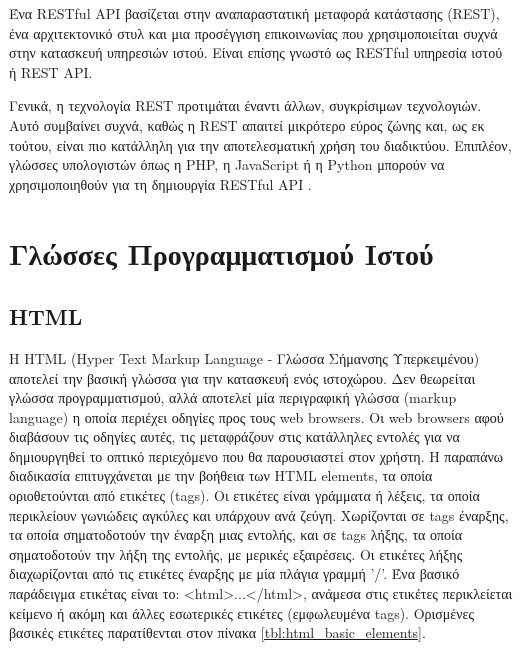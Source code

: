 Ένα RESTful API βασίζεται στην αναπαραστατική μεταφορά κατάστασης (REST), ένα αρχιτεκτονικό στυλ και μια προσέγγιση επικοινωνίας που χρησιμοποιείται συχνά στην κατασκευή υπηρεσιών ιστού. Είναι επίσης γνωστό ως RESTful υπηρεσία ιστού ή REST API.

Γενικά, η τεχνολογία REST προτιμάται έναντι άλλων, συγκρίσιμων τεχνολογιών. Αυτό συμβαίνει συχνά, καθώς η REST απαιτεί μικρότερο εύρος ζώνης και, ως εκ τούτου, είναι πιο κατάλληλη για την αποτελεσματική χρήση του διαδικτύου. Επιπλέον, γλώσσες υπολογιστών όπως η PHP, η JavaScript ή η Python μπορούν να χρησιμοποιηθούν για τη δημιουργία RESTful API \cite{Gillis_2020}.

\section{Γλώσσες Προγραμματισμού Ιστού}

\subsection{HTML}
Η HTML (Hyper Text Markup Language - Γλώσσα Σήμανσης Υπερκειμένου) αποτελεί την βασική γλώσσα για την κατασκευή ενός ιστοχώρου. Δεν θεωρείται γλώσσα προγραμματισμού, αλλά αποτελεί μία περιγραφική γλώσσα (markup language) η οποία περιέχει οδηγίες προς τους web browsers. Οι web browsers αφού διαβάσουν τις οδηγίες αυτές, τις μεταφράζουν στις κατάλληλες εντολές για να δημιουργηθεί το οπτικό περιεχόμενο που θα παρουσιαστεί στον χρήστη. Η παραπάνω διαδικασία επιτυγχάνεται με την βοήθεια των HTML elements, τα οποία οριοθετούνται από ετικέτες (tags). Οι ετικέτες είναι γράμματα ή λέξεις, τα οποία περικλείουν γωνιώδεις αγκύλες και υπάρχουν ανά ζεύγη. Χωρίζονται σε tags έναρξης, τα οποία σηματοδοτούν την έναρξη μιας εντολής, και σε tags λήξης, τα οποία σηματοδοτούν την λήξη της εντολής, με μερικές εξαιρέσεις. Οι ετικέτες λήξης διαχωρίζονται από τις ετικέτες έναρξης με μία πλάγια γραμμή '/'. Ένα βασικό παράδειγμα ετικέτας είναι το: <html>...</html>, ανάμεσα στις ετικέτες περικλείεται κείμενο ή ακόμη και άλλες εσωτερικές ετικέτες (εμφωλευμένα tags). Ορισμένες βασικές ετικέτες παρατίθενται στον πίνακα \ref{tbl:html_basic_elements}.

